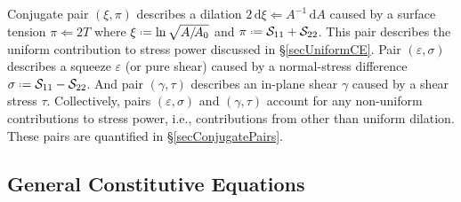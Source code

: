 Conjugate pair $( \xi , \pi )$ describes a dilation $2 \, \mathrm{d} \xi \Leftarrow A^{-1} \, \mathrm{d} A$ caused by a surface tension $\pi \Leftarrow 2T$ where $\xi \defeq \ln \sqrt{A / \! A_0}$ and $\pi \defeq \mathcal{S}_{11} + \mathcal{S}_{22}$.  This pair describes the uniform contribution to stress power discussed in \S\ref{secUniformCE}.  Pair $( \varepsilon , \sigma )$ describes a squeeze $\varepsilon$ (or pure shear) caused by a normal-stress difference $\sigma \defeq \mathcal{S}_{11} - \mathcal{S}_{22}$.  And pair $( \gamma , \tau )$ describes an in-plane shear $\gamma$ caused by a shear stress $\tau$. Collectively, pairs $( \varepsilon , \sigma )$ and $( \gamma , \tau )$ account for any non-uniform contributions to stress power, i.e., contributions from other than uniform dilation.  These pairs are quantified in \S\ref{secConjugatePairs}.

\subsection{General Constitutive Equations}

